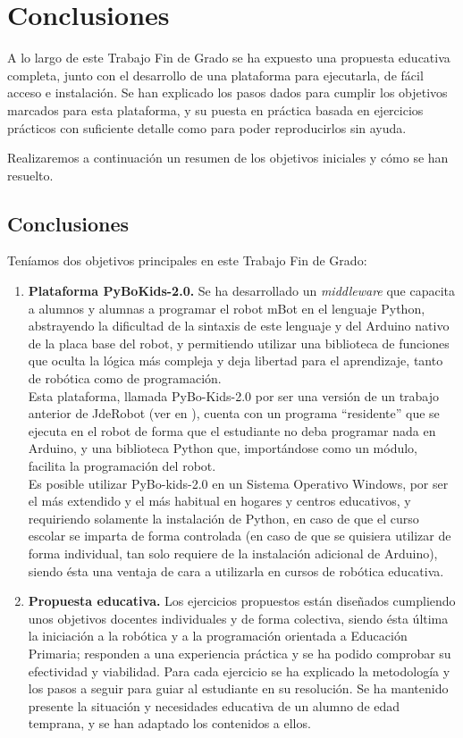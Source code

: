 \chapter{Conclusiones}\label{cap:conclusiones}
A lo largo de este Trabajo Fin de Grado se ha expuesto una propuesta educativa completa, junto con el desarrollo de una plataforma para ejecutarla, de fácil acceso e instalación. Se han explicado los pasos dados para cumplir los objetivos marcados para esta plataforma, y su puesta en práctica basada en ejercicios prácticos con suficiente detalle como para poder reproducirlos sin ayuda.
\par Realizaremos a continuación un resumen de los objetivos iniciales y cómo se han resuelto.
\section{Conclusiones}
Teníamos dos objetivos principales en este Trabajo Fin de Grado:
\begin{enumerate}
	\item \textbf{Plataforma PyBoKids-2.0.} Se ha desarrollado un \textit{middleware} que capacita a alumnos y alumnas a programar el robot mBot en el lenguaje Python, abstrayendo la dificultad de la sintaxis de este lenguaje y del Arduino nativo de la placa base del robot, y permitiendo utilizar una biblioteca de funciones que oculta la lógica más compleja y deja libertad para el aprendizaje, tanto de robótica como de programación. \\
	Esta plataforma, llamada PyBo-Kids-2.0 por ser una versión de un trabajo anterior de JdeRobot (ver en \cite{JdeRobot}), cuenta con un programa ``residente'' que se ejecuta en el robot de forma que el estudiante no deba programar nada en Arduino, y una biblioteca Python que, importándose como un módulo, facilita la programación del robot.\\
	Es posible utilizar PyBo-kids-2.0 en un Sistema Operativo Windows, por ser el más extendido y el más habitual en hogares y centros educativos, y requiriendo solamente la instalación de Python, en caso de que el curso escolar se imparta de forma controlada (en caso de que se quisiera utilizar de forma individual, tan solo requiere de la instalación adicional de Arduino), siendo ésta una ventaja de cara a utilizarla en cursos de robótica educativa. 
	
	\item \textbf{Propuesta educativa.} Los ejercicios propuestos están diseñados cumpliendo unos objetivos docentes individuales y de forma colectiva, siendo ésta última la iniciación a la robótica y a la programación orientada a Educación Primaria; responden a una experiencia práctica y se ha podido comprobar su efectividad y viabilidad. Para cada ejercicio se ha explicado la metodología y los pasos a seguir para guiar al estudiante en su resolución. Se ha mantenido presente la situación y necesidades educativa de un alumno de edad temprana, y se han adaptado los contenidos a ellos.  
\end{enumerate}
